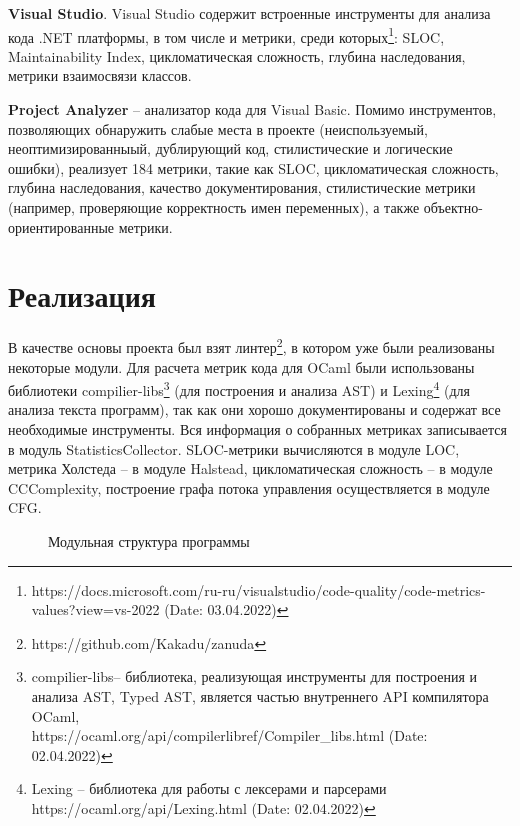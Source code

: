 \textbf{Visual Studio}. Visual Studio содержит
встроенные инструменты для анализа кода .NET
платформы, в том числе и метрики, среди которых\footnote{https://docs.microsoft.com/ru-ru/visualstudio/code-quality/code-metrics-values?view=vs-2022 (Date: 03.04.2022)}:
SLOC, Maintainability Index, цикломатическая сложность, глубина наследования, метрики взаимосвязи
классов.

\textbf{Project Analyzer} -- анализатор кода для Visual Basic. Помимо инструментов, позволяющих обнаружить слабые места в проекте (неиспользуемый, неоптимизированныый, дублирующий  код, стилистические и логические ошибки), реализует 184 метрики, такие как SLOC, цикломатическая сложность, глубина наследования, качество документирования, стилистические метрики (например, проверяющие корректность имен переменных), а также объектно-ориентированные метрики.
\section{Реализация}
В качестве основы проекта был взят линтер\footnote{https://github.com/Kakadu/zanuda}, в котором
уже были реализованы некоторые модули. Для расчета метрик кода для OCaml были использованы
библиотеки compilier-libs\footnote{compilier-libs-- библиотека, реализующая инструменты для построения и анализа AST, Typed AST,  является частью внутреннего API компилятора OCaml,\\
https://ocaml.org/api/compilerlibref/Compiler\_libs.html (Date: 02.04.2022)} (для построения и анализа AST) и Lexing\footnote{Lexing -- библиотека для работы с лексерами и парсерами\\ https://ocaml.org/api/Lexing.html (Date: 02.04.2022)} (для анализа текста программ), так как они хорошо документированы и содержат все
необходимые инструменты. Вся информация о собранных метриках записывается в модуль StatisticsCollector. SLOC-метрики вычисляются в модуле LOC, метрика Холстеда 
-- в модуле Halstead, цикломатическая сложность -- в модуле CCComplexity, построение
графа потока управления осуществляется в модуле CFG.
\begin{figure}[h]
    \caption{Модульная структура программы}
\end{figure}

